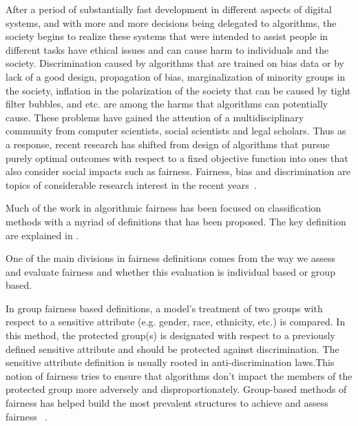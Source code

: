  
After a period of substantially fast development in different aspects of digital systems, and with more and more decisions being delegated to algorithms, the society begins to realize these systems that were intended to assist people in different tasks have ethical issues and can cause harm to individuals and the society. Discrimination caused by algorithms that are trained on bias data or by lack of a good design, propagation of bias, marginalization of minority groups in the society, inflation in the polarization of the society that can be caused by tight filter bubbles, and etc. are among the harms that algorithms can potentially cause. These problems have gained the attention of a multidisciplinary community from computer scientists, social scientists and legal scholars. Thus as a response, recent research has shifted from design of algorithms that pursue purely optimal outcomes with respect to a fixed objective function into ones that also consider social impacts such as fairness.
Fairness, bias and discrimination are topics of considerable research interest in the recent years~\cite{pedreshi2008discrimination,fairness,bozdag_bias_2013}.

Much of the work in algorithmic fairness has been focused on classification methods with a myriad of definitions that has been proposed. The key definition are explained in \cite{mitchell2021algorithmic}.

One of the main divisions in fairness definitions comes from the way we assess and evaluate fairness and whether this evaluation is individual based or group based.

In group fairness based definitions, a model’s treatment of two groups with respect to a sensitive attribute (e.g. gender, race, ethnicity, etc.) is compared. In this method, the protected group(s) is designated with respect to a previously defined sensitive attribute and should be protected against discrimination. The sensitive attribute definition is usually rooted in anti-discrimination laws\cite{barocas2016big}.This notion of fairness tries to ensure that algorithms don't impact the members of the protected group more adversely and disproportionately. Group-based methods of fairness has helped build the most prevalent structures to achieve and assess fairness ~\cite{zemel2013learning,kamishima2012fairness,kamiran2010discrimination,zhang2017anti}.


